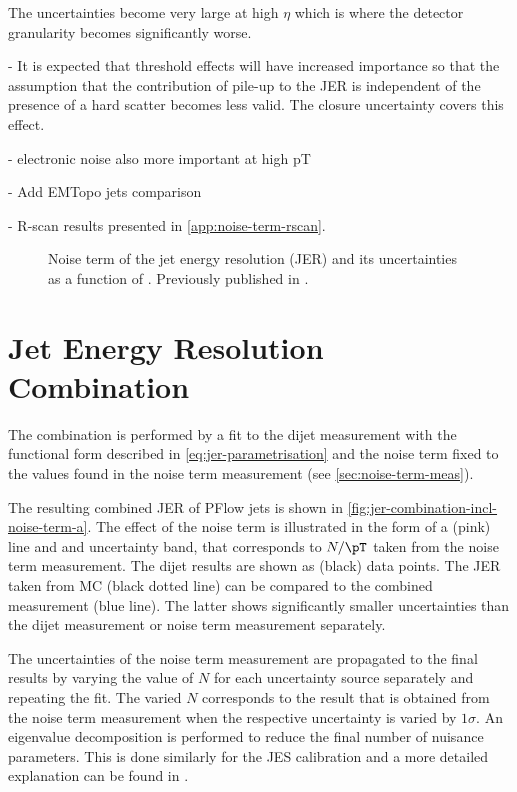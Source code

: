 The uncertainties become very large at high $\eta$ which is where the detector granularity becomes significantly worse.

- It is expected that threshold effects will have increased importance so that the assumption that the contribution of pile-up to the JER is independent of the presence of a hard scatter becomes less valid. The closure uncertainty covers this effect.

- electronic noise also more important at high pT

- Add EMTopo jets comparison

- R-scan results presented in \cref{app:noise-term-rscan}.


\begin{figure}
    \caption{Noise term of the jet energy resolution (JER) and its uncertainties as a function of \abseta. Previously published in .}
    \label{fig:noise-term-results-pflow}
\end{figure}



\section{Jet Energy Resolution Combination}

The combination is performed by a fit to the dijet measurement with the functional form described in \cref{eq:jer-parametrisation} and the noise term fixed to the values found in the noise term measurement (see \cref{sec:noise-term-meas}).

The resulting combined JER of PFlow jets is shown in \cref{fig:jer-combination-incl-noise-term-a}. The effect of the noise term is illustrated in the form of a (pink) line and and uncertainty band, that corresponds to $N / \pT$ taken from the noise term measurement. The dijet results are shown as (black) data points.
The JER taken from MC (black dotted line) can be compared to the combined \insitu measurement (blue line). The latter shows significantly smaller uncertainties than the dijet measurement or noise term measurement separately. 

The uncertainties of the noise term measurement are propagated to the final results by varying the value of $N$ for each uncertainty source separately and repeating the fit. The varied $N$ corresponds to the result that is obtained from the noise term measurement when the respective uncertainty is varied by $1\sigma$.
An eigenvalue decomposition is performed to reduce the final number of nuisance parameters. This is done similarly for the JES calibration and a more detailed explanation can be found in .

